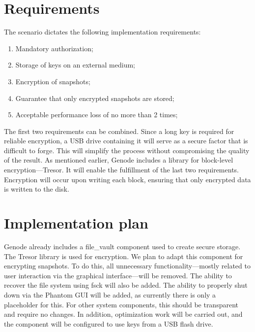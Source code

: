 \section{Requirements}

The scenario dictates the following implementation requirements:
\begin{enumerate}
    \item Mandatory authorization;
    \item Storage of keys on an external medium;
    \item Encryption of snapshots;
    \item Guarantee that only encrypted snapshots are stored;
    \item Acceptable performance loss of no more than 2 times;
\end{enumerate}
The first two requirements can be combined. Since a long key is required for reliable encryption, a USB drive containing it will serve as a secure factor that is difficult to forge. This will simplify the process without compromising the quality of the result. As mentioned earlier, Genode includes a library for block-level encryption—Tresor. It will enable the fulfillment of the last two requirements. Encryption will occur upon writing each block, ensuring that only encrypted data is written to the disk.

\section{Implementation plan}

Genode already includes a file\_vault component used to create secure storage. The Tresor library is used for encryption. We plan to adapt this component for encrypting snapshots. To do this, all unnecessary functionality—mostly related to user interaction via the graphical interface—will be removed. The ability to recover the file system using fsck will also be added. The ability to properly shut down via the Phantom GUI will be added, as currently there is only a placeholder for this. For other system components, this should be transparent and require no changes. In addition, optimization work will be carried out, and the component will be configured to use keys from a USB flash drive.
